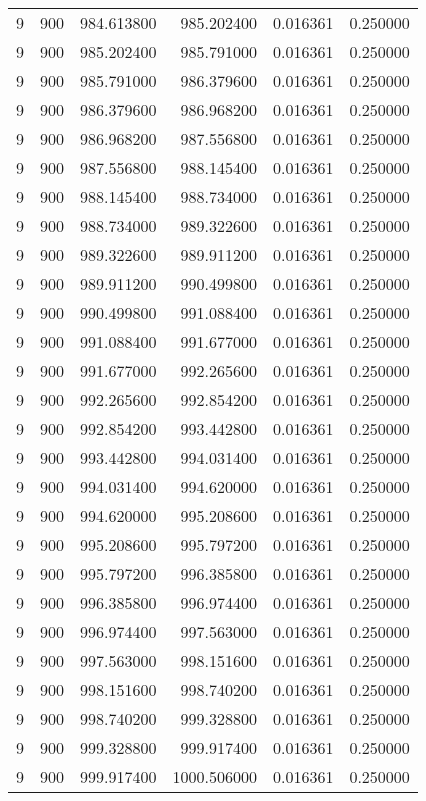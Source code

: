 \begin{longtable}{rrrrrr}
9 & 900 & 984.613800 & 985.202400 & 0.016361 & 0.250000 \\
9 & 900 & 985.202400 & 985.791000 & 0.016361 & 0.250000 \\
9 & 900 & 985.791000 & 986.379600 & 0.016361 & 0.250000 \\
9 & 900 & 986.379600 & 986.968200 & 0.016361 & 0.250000 \\
9 & 900 & 986.968200 & 987.556800 & 0.016361 & 0.250000 \\
9 & 900 & 987.556800 & 988.145400 & 0.016361 & 0.250000 \\
9 & 900 & 988.145400 & 988.734000 & 0.016361 & 0.250000 \\
9 & 900 & 988.734000 & 989.322600 & 0.016361 & 0.250000 \\
9 & 900 & 989.322600 & 989.911200 & 0.016361 & 0.250000 \\
9 & 900 & 989.911200 & 990.499800 & 0.016361 & 0.250000 \\
9 & 900 & 990.499800 & 991.088400 & 0.016361 & 0.250000 \\
9 & 900 & 991.088400 & 991.677000 & 0.016361 & 0.250000 \\
9 & 900 & 991.677000 & 992.265600 & 0.016361 & 0.250000 \\
9 & 900 & 992.265600 & 992.854200 & 0.016361 & 0.250000 \\
9 & 900 & 992.854200 & 993.442800 & 0.016361 & 0.250000 \\
9 & 900 & 993.442800 & 994.031400 & 0.016361 & 0.250000 \\
9 & 900 & 994.031400 & 994.620000 & 0.016361 & 0.250000 \\
9 & 900 & 994.620000 & 995.208600 & 0.016361 & 0.250000 \\
9 & 900 & 995.208600 & 995.797200 & 0.016361 & 0.250000 \\
9 & 900 & 995.797200 & 996.385800 & 0.016361 & 0.250000 \\
9 & 900 & 996.385800 & 996.974400 & 0.016361 & 0.250000 \\
9 & 900 & 996.974400 & 997.563000 & 0.016361 & 0.250000 \\
9 & 900 & 997.563000 & 998.151600 & 0.016361 & 0.250000 \\
9 & 900 & 998.151600 & 998.740200 & 0.016361 & 0.250000 \\
9 & 900 & 998.740200 & 999.328800 & 0.016361 & 0.250000 \\
9 & 900 & 999.328800 & 999.917400 & 0.016361 & 0.250000 \\
9 & 900 & 999.917400 & 1000.506000 & 0.016361 & 0.250000 \\

\end{longtable}
